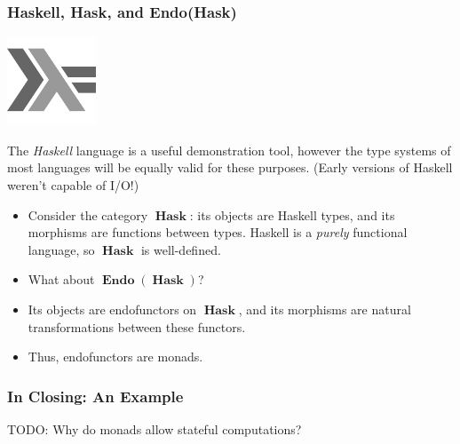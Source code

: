 \documentclass{beamer}
\numberwithin{figure}{section}
\DeclareMathOperator{\catendo}{\mathbf{Endo}}
\DeclareMathOperator{\cathask}{\mathbf{Hask}}
\begin{document}
\begin{frame}
        \frametitle{Haskell, \textbf{Hask}, and \textbf{Endo}(\textbf{Hask})}
        \begin{center}
                \begin{minipage}{.2\textwidth}
                        \includegraphics{hasklogo.pdf}
                \end{minipage}
                \begin{minipage}{.7\textwidth}
                        The \textit{Haskell} language is a useful demonstration
                        tool, however the type systems of most languages will be
                        equally valid for these purposes. (Early versions of
                        Haskell weren't capable of I/O!)
                \end{minipage}
        \end{center}
        \pause
        \begin{itemize}[<+->]
                \item Consider the category $\cathask$: its objects are Haskell
                        types, and its morphisms are functions between types.
                        Haskell is a \textit{purely} functional language, so
                        $\cathask$ is well-defined.
                \item What about $\catendo(\cathask)$?
                \item Its objects are endofunctors on $\cathask$, and its
                        morphisms are natural transformations between these
                        functors.
                \item Thus, endofunctors are monads.
        \end{itemize}
\end{frame}

\begin{frame}
        \frametitle{In Closing: An Example}
        TODO: Why do monads allow stateful computations?
\end{frame}
\end{document}
